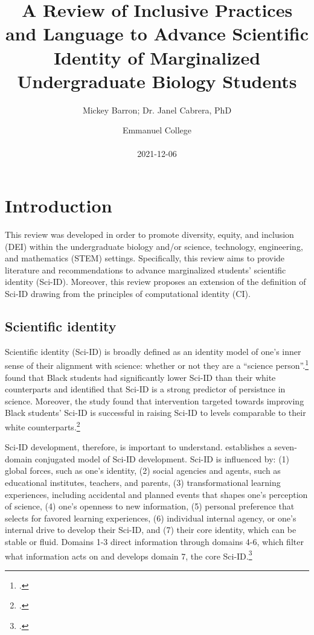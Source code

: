 \documentclass[10pt, twocolumn]{article}
\title{A Review of Inclusive Practices and Language to Advance Scientific Identity of Marginalized Undergraduate Biology Students}
\author{Mickey Barron; Dr. Janel Cabrera, PhD}
\date{Emmanuel College \\ ~ \\ 2021-12-06}
\begin{document}
\begingroup

    \onecolumn

    \maketitle


    \tableofcontents

    \twocolumn


\endgroup

\section{Introduction}

    This review was developed in order to promote diversity, equity, and inclusion (DEI) within the undergraduate biology and/or science, technology, engineering, and mathematics (STEM) settings. Specifically, this review aims to provide literature and recommendations to advance marginalized students' scientific identity (Sci-ID). Moreover, this review proposes an extension of the definition of Sci-ID drawing from the principles of computational identity (CI).

    \subsection{Scientific identity}

        Scientific identity (Sci-ID) is broadly defined as an identity model of one's inner sense of their alignment with science: whether or not they are a ``science person''.\footcite{salehjee_models_2018} \cite{oseguera_examining_2019} found that Black students had significantly lower Sci-ID than their white counterparts and identified that Sci-ID is a strong predictor of persistnce in science. Moreover, the study found that intervention targeted towards improving Black students' Sci-ID is successful in raising Sci-ID to levels comparable to their white counterparts.\footcite{oseguera_examining_2019}
        
        Sci-ID development, therefore, is important to understand. \cite{salehjee_models_2018} establishes a seven-domain conjugated model of Sci-ID development. Sci-ID is influenced by: (1) global forces, such as one's identity, (2) social agencies and agents, such as educational institutes, teachers, and parents, (3) transformational learning experiences, including accidental and planned events that shapes one's perception of science, (4) one's openness to new information, (5) personal preference that selects for favored learning experiences, (6) individual internal agency, or one's internal drive to develop their Sci-ID, and (7) their core identity, which can be stable or fluid. Domains 1-3 direct information through domains 4-6, which filter what information acts on and develops domain 7, the core Sci-ID.\footcite{salehjee_models_2018}
\end{document}
